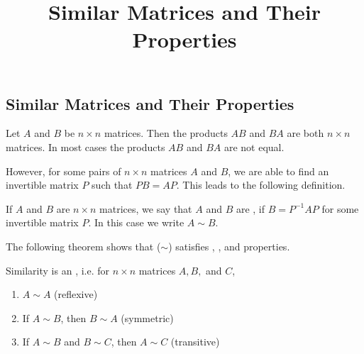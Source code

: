 \documentclass{ximera}
\title{Similar Matrices and Their Properties} \license{CC BY-NC-SA 4.0}
\begin{document}
\begin{abstract}
\end{abstract}
\maketitle

\begin{onlineOnly}
\section*{Similar Matrices and Their Properties}
\end{onlineOnly}

Let $A$ and $B$ be $n \times n$ matrices.  Then the products $AB$ and $BA$ are both $n \times n$ matrices.  In most cases the products $AB$ and $BA$ are not equal.

However, for some pairs of $n \times n$ matrices $A$ and $B$, we are able to find an invertible matrix $P$ such that $PB = AP$.  This leads to the following definition.

\begin{definition}\label{def:similar}
If $A$ and $B$ are $n \times n$ matrices, we say that $A$ and $B$ are , if $B = P^{-1}AP$ for some invertible matrix $P$.  In this case we write $A \sim B$.
\end{definition}



 
The following theorem shows that  ($\sim$) satisfies , , and  properties.  %

\begin{theorem}\label{th:similarityequivalence}
Similarity is an , i.e. for $n \times n$ matrices $A,B,$ and $C$,
\begin{enumerate}
\item\label{item:reflexive} $A \sim A$ (reflexive)
\item\label{item:symmetric} If $A \sim B$, then $B \sim A$ (symmetric)
\item\label{item:transitive} If $A \sim B$ and $B \sim C$, then $A \sim C$ (transitive)
\end{enumerate}
\end{theorem}
\end{document}
